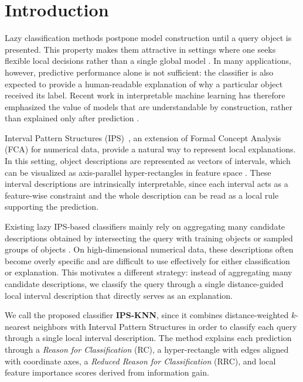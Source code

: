 \documentclass[a4paper,fleqn]{cas-sc}
\begin{document}
\section{Introduction}

Lazy classification methods postpone model construction until a query object is presented. This property makes them attractive in settings where one seeks flexible local decisions rather than a single global model \cite{aha1991instance, kuznetsov2013scalable}. In many applications, however, predictive performance alone is not sufficient: the classifier is also expected to provide a human-readable explanation of why a particular object received its label. Recent work in interpretable machine learning has therefore emphasized the value of models that are understandable by construction, rather than explained only after prediction \cite{rudin2019stop, molnar2025, bodria2023benchmarking}.

Interval Pattern Structures (IPS)~\cite{kaytoue2011revisiting}, an extension of Formal Concept Analysis (FCA) for numerical data, provide a natural way to represent local explanations. In this setting, object descriptions are represented as vectors of intervals, which can be visualized as axis-parallel hyper-rectangles in feature space \cite{kuznetsov2013fitting, kaytoue2011mining}. These interval descriptions are intrinsically interpretable, since each interval acts as a feature-wise constraint and the whole description can be read as a local rule supporting the prediction.

Existing lazy IPS-based classifiers mainly rely on aggregating many candidate descriptions obtained by intersecting the query with training objects or sampled groups of objects \cite{masyutin2015lazy}. On high-dimensional numerical data, these descriptions often become overly specific and are difficult to use effectively for either classification or explanation. This motivates a different strategy: instead of aggregating many candidate descriptions, we classify the query through a single distance-guided local interval description that directly serves as an explanation.

We call the proposed classifier \textbf{IPS-KNN}, since it combines distance-weighted \(k\)-nearest neighbors with Interval Pattern Structures in order to classify each query through a single local interval description. The method explains each prediction through a \textit{Reason for Classification} (RC), a hyper-rectangle with edges aligned with coordinate axes, a \textit{Reduced Reason for Classification} (RRC), and local feature importance scores derived from information gain.
\end{document}
